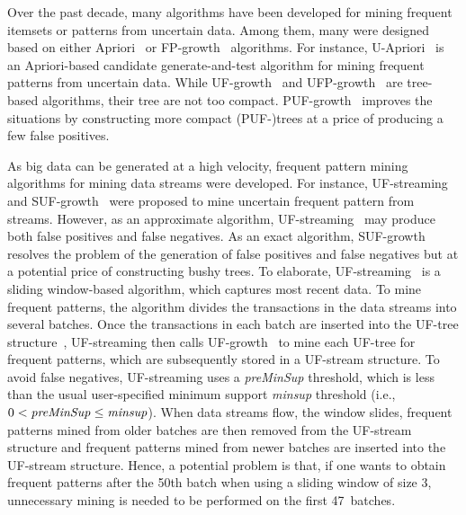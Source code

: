 \documentclass[10pt, conference, compsocconf]{IEEEtran}
\begin{document}
Over the past decade, many algorithms have been developed for mining frequent itemsets or patterns from uncertain data. Among them, many were designed based on either Apriori~\cite{DBLP:conf/vldb/AgrawalS94} or FP-growth~\cite{DBLP:journals/datamine/HanPYM04} algorithms. 
For instance, \mbox{U-Apriori}~\cite{DBLP:journals/tkde/ZhaoYN14} is an Apriori-based candidate generate-and-test algorithm for mining frequent patterns from uncertain data.
While UF-growth~\cite{DBLP:conf/kdd/GadeWK04} and UFP-growth~\cite{DBLP:conf/kdd/AggarwalLWW09} are tree-based algorithms, their tree are not too compact.
\mbox{PUF-growth}~\cite{DBLP:conf/pakdd/LeungT13} improves the situations by constructing more compact (PUF-)trees at a price of producing a few false positives.

As big data can be generated at a high velocity, frequent pattern mining algorithms for mining data streams were developed. For instance, UF-streaming~\cite{DBLP:conf/icde/LeungH09} and \mbox{SUF-growth}~\cite{DBLP:conf/icde/LeungH09} were proposed to mine uncertain frequent pattern from streams. 
However, as an approximate algorithm, \mbox{UF-streaming}~\cite{DBLP:conf/icde/LeungH09} may produce both false positives and false negatives. As an exact algorithm, SUF-growth~\cite{DBLP:conf/icde/LeungH09} resolves the problem of the generation of false positives and false negatives but at a potential price of constructing bushy trees.
To elaborate, 
UF-streaming~\cite{DBLP:conf/icde/LeungH09} is a sliding window-based algorithm, which captures most recent data. To mine frequent patterns, the algorithm divides the transactions in the data streams into several batches. Once the transactions in each batch are inserted into the UF-tree structure~\cite{DBLP:conf/kdd/GadeWK04}, UF-streaming then calls \mbox{UF-growth}~\cite{DBLP:conf/kdd/GadeWK04} to mine each \mbox{UF-tree} for frequent patterns, which are  subsequently stored in a UF-stream structure. To avoid false negatives, UF-streaming uses a {\it preMinSup} threshold, which is less than the usual user-specified minimum support {\it minsup} threshold (i.e., $0 < {\it preMinSup} \leq {\it minsup}$). 
When data streams flow, the window slides, frequent patterns mined from older batches are then removed from the UF-stream structure and frequent patterns mined from newer batches are inserted into the UF-stream structure. Hence, a potential problem is that, if one wants to obtain frequent patterns after the 50th batch when using a sliding window of size 3, unnecessary mining is needed to be performed on the first 47~batches.
\end{document}
